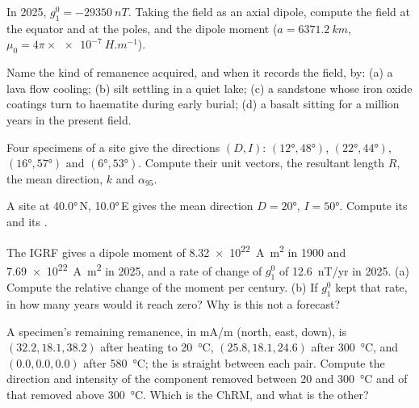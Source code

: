 \begin{exercise}[$\star$]\label{exo:b3:palaeomagnetism:3}
In 2025, $g_1^0 = \qty{-29350}{nT}$. Taking the field as an axial dipole,
compute the field at the equator and at the poles, and the dipole moment
($a = \qty{6371.2}{km}$, $\mu_0 = 4\pi\times\qty{e-7}{H.m^{-1}}$).
\end{exercise}

\begin{exercise}[$\star$]\label{exo:b3:palaeomagnetism:4}
Name the kind of remanence acquired, and when it records the field, by: (a) a
lava flow cooling; (b) silt settling in a quiet lake; (c) a sandstone whose
iron oxide coatings turn to haematite during early burial; (d) a basalt sitting
for a million years in the present field.
\end{exercise}

\begin{exercise}[$\star\star$]\label{exo:b3:palaeomagnetism:5}
Four specimens of a site give the directions $(D, I)$: $(\ang{12}, \ang{48})$,
$(\ang{22}, \ang{44})$, $(\ang{16}, \ang{57})$ and $(\ang{6}, \ang{53})$.
Compute their unit vectors, the resultant length $R$, the mean direction, $k$
and $\alpha_{95}$.
\end{exercise}

\begin{exercise}[$\star\star$]\label{exo:b3:palaeomagnetism:6}
A site at \ang{40.0}\,N, \ang{10.0}\,E gives the mean direction $D = \ang{20}$,
$I = \ang{50}$. Compute its  and its .
\end{exercise}

\begin{exercise}[$\star\star$]\label{exo:b3:palaeomagnetism:7}
The IGRF gives a dipole moment of \qty{8.32e22}{A.m^2} in 1900 and
\qty{7.69e22}{A.m^2} in 2025, and a rate of change of $g_1^0$ of
\qty{+12.6}{nT/yr} in 2025. (a) Compute the relative change of the moment per
century. (b) If $g_1^0$ kept that rate, in how many years would it reach zero?
Why is this not a forecast?
\end{exercise}

\begin{exercise}[$\star\star$]\label{exo:b3:palaeomagnetism:8}
A specimen's remaining remanence, in \unit{mA/m} (north, east, down), is
$(32.2, 18.1, 38.2)$ after heating to \qty{20}{\celsius}, $(25.8, 18.1, 24.6)$
after \qty{300}{\celsius}, and $(0.0, 0.0, 0.0)$ after \qty{580}{\celsius}; the
 is straight between each pair. Compute the direction and
intensity of the component removed between 20 and \qty{300}{\celsius} and of
that removed above \qty{300}{\celsius}. Which is the ChRM, and what is the
other?
\end{exercise}

